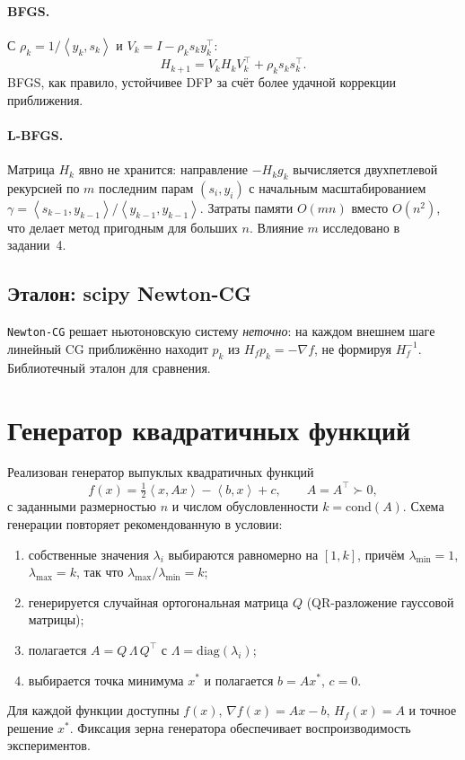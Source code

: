 \documentclass[a4paper,12pt]{article}
\newcommand{\grad}{\nabla}
\newcommand{\inner}[2]{\left\langle #1, #2 \right\rangle}
\theoremstyle{definition}
\begin{document}
\paragraph{BFGS.} С $\rho_k = 1/\inner{y_k}{s_k}$ и $V_k = I - \rho_k s_k y_k^\top$:
\[
    H_{k+1} = V_k H_k V_k^\top + \rho_k s_k s_k^\top.
\]
BFGS, как правило, устойчивее DFP за счёт более удачной коррекции приближения.

\paragraph{L-BFGS.} Матрица $H_k$ явно не хранится: направление $-H_k g_k$ вычисляется
двухпетлевой рекурсией по $m$ последним парам $(s_i, y_i)$ с начальным масштабированием
$\gamma = \inner{s_{k-1}}{y_{k-1}} / \inner{y_{k-1}}{y_{k-1}}$. Затраты памяти $O(mn)$ вместо
$O(n^2)$, что делает метод пригодным для больших $n$. Влияние $m$ исследовано в задании~4.

\subsection{Эталон: scipy Newton-CG}

\verb|Newton-CG| решает ньютоновскую систему \emph{неточно}: на каждом внешнем шаге линейный CG
приближённо находит $p_k$ из $H_f p_k = -\grad f$, не формируя $H_f^{-1}$. Библиотечный эталон для сравнения.

\section{Генератор квадратичных функций}

Реализован генератор выпуклых квадратичных функций
\[
    f(x) = \tfrac12 \inner{x}{Ax} - \inner{b}{x} + c, \qquad A = A^\top \succ 0,
\]
с заданными размерностью $n$ и числом обусловленности $k = \mathrm{cond}(A)$. Схема генерации
повторяет рекомендованную в условии:
\begin{enumerate}
    \item собственные значения $\lambda_i$ выбираются равномерно на $[1, k]$, причём
          $\lambda_{\min} = 1$, $\lambda_{\max} = k$, так что $\lambda_{\max}/\lambda_{\min} = k$;
    \item генерируется случайная ортогональная матрица $Q$ (QR-разложение гауссовой матрицы);
    \item полагается $A = Q\,\Lambda\,Q^\top$ с $\Lambda = \mathrm{diag}(\lambda_i)$;
    \item выбирается точка минимума $x^*$ и полагается $b = A x^*$, $c = 0$.
\end{enumerate}
Для каждой функции доступны $f(x)$, $\grad f(x) = Ax - b$, $H_f(x) = A$ и точное решение $x^*$.
Фиксация зерна генератора обеспечивает воспроизводимость экспериментов.
\end{document}
